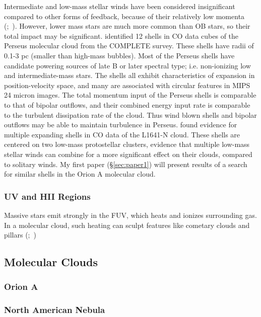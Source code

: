 Intermediate and low-mass stellar winds have been considered insignificant compared to other forms of feedback, because of their relatively low momenta (\citet{Vink01};~\citet{Smith14a}). However, lower mass stars are much more common than OB stars, so their total impact may be significant. \cite{Arce_2011} identified 12 shells in CO data cubes of the Perseus molecular cloud from the COMPLETE survey. These shells have radii of 0.1-3 pc (smaller than high-mass bubbles). Most of the Perseus shells have candidate powering sources of late B or later spectral type; i.e. non-ionizing low and intermediate-mass stars. The shells all exhibit characteristics of expansion in position-velocity space, and many are associated with circular features in MIPS 24 micron images. The total momentum input of the Perseus shells is comparable to that of bipolar outflows, and their combined energy input rate is comparable to the turbulent dissipation rate of the cloud. Thus wind blown shells and bipolar outflows may be able to maintain turbulence in Perseus. \cite{Nakamura12} found evidence for multiple expanding shells in CO data of the L1641-N cloud. These shells are centered on two low-mass protostellar clusters, evidence that multiple low-mass stellar winds can combine for a more significant effect on their clouds, compared to solitary winds. My first paper (\S\ref{sec:paper1}) will present results of a search for similar shells in the Orion A molecular cloud.

\subsubsection{UV and HII Regions}\label{sec:uv}
Massive stars emit strongly in the FUV, which heats and ionizes surrounding gas. In a molecular cloud, such heating can sculpt features like cometary clouds and pillars (\citet{1983A&A...117..183R};~\citet{Walawender04})


\subsection{Molecular Clouds}\label{sec:clouds}

\subsubsection{Orion A}\label{sec:orion}

\subsubsection{North American Nebula}\label{sec:nan}
  
  
  
  
  